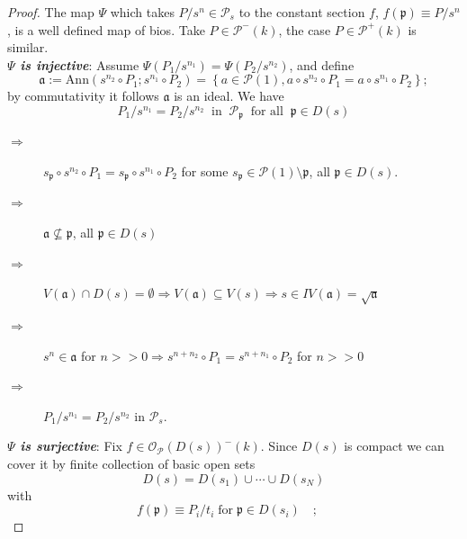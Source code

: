 \documentclass[leqno]{article}
\newcommand{\oneideal}{\mathfrak{a}}
\newcommand{\myemph}[1]{{\it{\bf{#1}}}}
\newcommand{\biop}{\mathscr{P}}
\numberwithin{equation}{section}
\begin{document}
\begin{proof}
				The map $\Psi$ which takes $P/s^{n}\in \biop_{s}$ to the constant section
				$f$, $f(\mathfrak{p})\equiv P/s^{n}$, is a well defined map of bios. Take $P\in
				\biop^{-}(k)$, the case $P\in\biop^{+}(k) $ is similar. \\
				\myemph{$\Psi$ is injective}: Assume $\Psi\left( P_{1}/s^{n_1}
				\right)=\Psi(P_2/s^{n_2})$, and define 
				\begin{equation*}
								\oneideal := \text{Ann}\left( s^{n_2}\circ P_{1} ; s^{n_1}\circ P_2
								\right)=\left\{ a\in \biop(1), a\circ s^{n_2}\circ P_{1}=a\circ
								s^{n_{1}}\circ P_2 \right\}; 
				\end{equation*}
				by commutativity it follows $\oneideal $ is an ideal. We have
				\begin{equation*}
								P_1/s^{n_1}=P_2/s^{n_2}\;\; \text{in}\;\; \biop_{\mathfrak{p}} \;\;\text{for all}\;\; \mathfrak{p}\in D(s)
				\end{equation*}
				\begin{description}
								\item[$\Rightarrow$ ]  $s_{\mathfrak{p}}\circ s^{n_2}\circ
												P_1=s_{\mathfrak{p}}\circ
												s^{n_1}\circ P_2$ for some $s_{\mathfrak{p}}\in \biop(1)\setminus
												\mathfrak{p}$,
												all $\mathfrak{p}\in D(s)$. 
								\item[$\Rightarrow$ ]  $\oneideal\not\subseteq\mathfrak{p}$, all
												$\mathfrak{p}\in
												D(s)$
								\item[$\Rightarrow$ ]  $V(\oneideal)\cap D(s)=\emptyset\Rightarrow
												V(\oneideal)\subseteq V(s)\Rightarrow s\in
												IV(\oneideal)=\sqrt{\oneideal}$ 
								\item[$\Rightarrow$ ] $s^{n}\in \oneideal$ for $n>>0 \Rightarrow
												s^{n+n_{2}}\circ P_{1}=s^{n+n_1}\circ P_{2}$ for $n>>0$
								\item[$\Rightarrow$ ] $P_1/s^{n_1}=P_2/s^{n_2}$ in $\biop_{s}$.
				\end{description}
				\myemph{$\Psi$ is surjective}: Fix $f\in
				\mathscr{O}_{\biop}(D(s))^{-}(k)$. Since $D(s)$ is compact we can cover it by
				finite collection of basic open sets 
				\begin{equation*}
								D(s)=D(s_{1})\cup\cdots\cup D(s_{N})
				\end{equation*}
				with 
				\begin{equation*}
								f(\mathfrak{p})\equiv P_{i}/t_{i} \;\text{for}\; \mathfrak{p} \in D(s_{i})\quad ;\quad

\end{equation*}
\end{proof}
\end{document}
